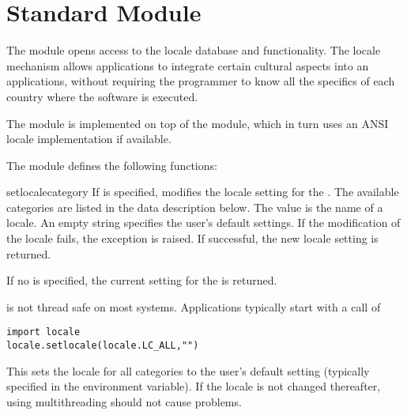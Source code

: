 \section{Standard Module }

\label{module-locale}

The  module opens access to the \POSIX{} locale database
and functionality. The \POSIX{} locale mechanism allows applications
to integrate certain cultural aspects into an applications, without
requiring the programmer to know all the specifics of each country
where the software is executed.

The  module is implemented on top of the 
module, which in turn uses an ANSI \C{} locale implementation if
available.

The  module defines the following functions:


\begin{funcdesc}{setlocale}{category}
If  is specified, modifies the locale setting for the
. The available categories are listed in the data
description below. The value is the name of a locale. An empty string
specifies the user's default settings. If the modification of the
locale fails, the exception  is
raised. If successful, the new locale setting is returned.

If no  is specified, the current setting for the
 is returned.

 is not thread safe on most systems. Applications
typically start with a call of
\begin{verbatim}
import locale
locale.setlocale(locale.LC_ALL,"")
\end{verbatim}
This sets the locale for all categories to the user's default setting
(typically specified in the  environment variable). If the
locale is not changed thereafter, using multithreading should not
cause problems.
\end{funcdesc}

